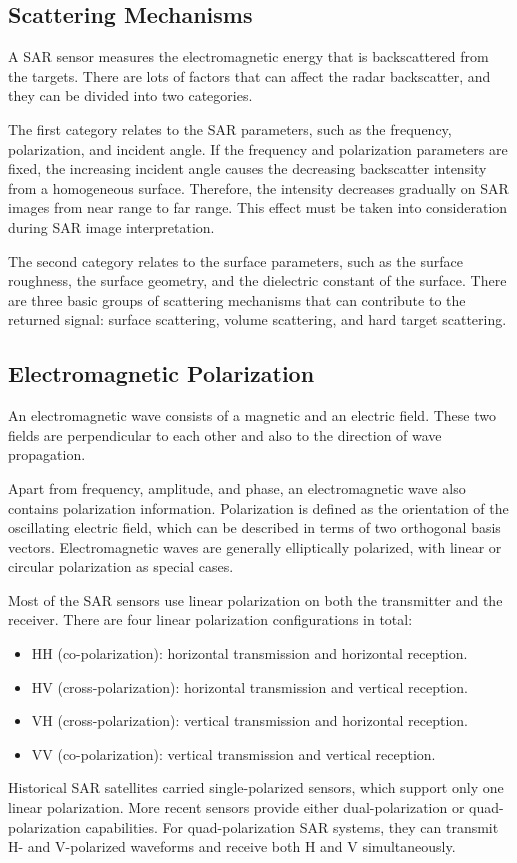\subsection{Scattering Mechanisms}
A SAR sensor measures the electromagnetic energy that is backscattered from the targets. 
There are lots of factors that can affect the radar backscatter, and they can be divided into two categories.

The first category relates to the SAR parameters, such as the frequency, polarization, and incident angle. If the frequency and
polarization parameters are fixed, the increasing incident angle causes the decreasing backscatter intensity from a homogeneous surface. 
Therefore, the intensity decreases gradually on SAR images from near range to far range. This effect must be taken into consideration during SAR image
interpretation.

The second category relates to the surface parameters, such as the surface roughness, the surface geometry, and the dielectric constant of the
surface. There are three basic groups of scattering mechanisms that can contribute to the returned signal: surface scattering, volume scattering, and hard target scattering.

\subsection{Electromagnetic Polarization}
An electromagnetic wave consists of a magnetic and an electric field.
These two fields are perpendicular to each other and also to the direction of wave propagation.

Apart from frequency, amplitude, and phase, an electromagnetic wave also contains polarization information.
Polarization is defined as the orientation of the oscillating electric field, which can be described in terms of two orthogonal basis vectors.
Electromagnetic waves are generally elliptically polarized, with linear or circular polarization as special cases.

Most of the SAR sensors use linear polarization on both the transmitter and the receiver. 
There are four linear polarization configurations in total:
\begin{itemize}
	\item HH (co-polarization): horizontal transmission and horizontal reception.
	\item HV (cross-polarization): horizontal transmission and vertical reception.
	\item VH (cross-polarization): vertical transmission and horizontal reception.
	\item VV (co-polarization): vertical transmission and vertical reception.
\end{itemize}
Historical SAR satellites carried single-polarized sensors, which support only one linear polarization. More recent sensors provide either dual-polarization
or quad-polarization capabilities. 
For quad-polarization SAR systems, they can transmit H- and V-polarized waveforms and receive both H and V simultaneously.

